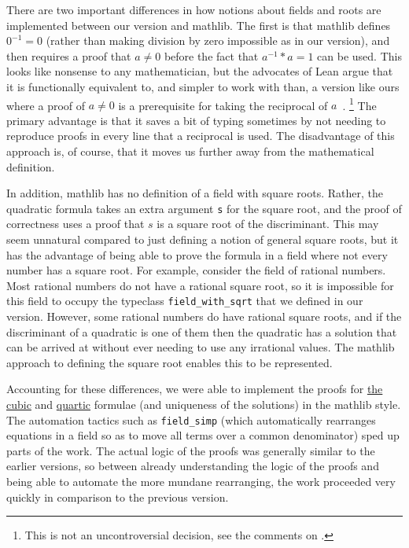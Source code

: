 \documentclass{article} %
\theoremstyle{plain}
\theoremstyle{definition}
\newcommand{\Lean}{\textsf{Lean}\xspace}
\newcommand{\mathlib}{\textsf{mathlib}\xspace}
\begin{document}
There are two important differences in how notions about fields and roots are implemented between our version and \mathlib.
The first is that \mathlib defines $0^{-1} = 0$ (rather than making division by zero impossible as in our version),
and then requires a proof that $a \ne 0$ before the fact that $a^{-1} * a = 1$ can be used.  
This looks like nonsense to any mathematician, but the advocates of \Lean argue that it is functionally equivalent to, and simpler to work with than, a version like ours
where a proof of $a \ne 0$ is a prerequisite for taking the reciprocal of $a$~\cite{div_by_zero}.%
\footnote{This is not an uncontroversial decision, see the comments on \cite{div_by_zero}.}
The primary advantage is that it saves a bit of typing sometimes by not needing to reproduce proofs in every line that a reciprocal is used.  
The disadvantage of this approach is, of course,
that it moves us further away from the mathematical definition.

In addition, \mathlib has no definition of a field with square roots.  
Rather, the quadratic formula takes an extra argument \lstinline!s! for the square root, and the proof of correctness uses a proof
that $s$ is a square root of the discriminant.  
This may seem unnatural compared to just defining a notion of general square roots,
but it has the advantage of being able to prove the formula in a field where not every number has a square root.  
For example, consider the field of rational numbers.  
Most rational numbers do not have a rational square root, so it is impossible for this field to occupy the typeclass \lstinline!field_with_sqrt! that we defined in our version.
However, some rational numbers do have rational square roots, and if the discriminant of a quadratic is one of them
then the quadratic has a solution that can be arrived at without ever needing to use any irrational values.  
The \mathlib approach to defining the square root enables this to be represented.

Accounting for these differences, we were able to implement the proofs for \href{https://github.com/anonymousLeanDocsHosting/lean-polynomials/blob/main/mathlib/cubic_solution.lean}{the cubic} and \href{https://github.com/anonymousLeanDocsHosting/lean-polynomials/blob/main/mathlib/quartic_solution.lean}{quartic} formulae (and uniqueness of the solutions) in the \mathlib style.
The automation tactics such as \lstinline!field_simp! (which automatically rearranges equations in a field so as to move all terms over a common denominator) sped up parts of the work.
The actual logic of the proofs was generally similar to the earlier versions,
so between already understanding the logic of the proofs and being able to automate the more mundane rearranging,
the work proceeded very quickly in comparison to the previous version.
\end{document}
